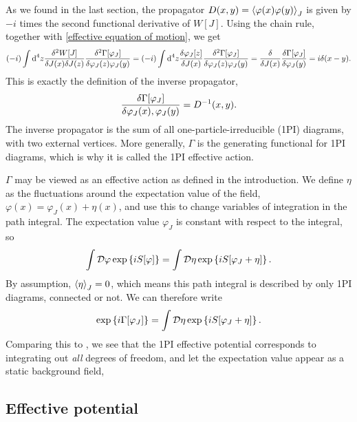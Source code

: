 As we found in the last section, the propagator $D(x, y) = \left\langle \varphi(x)\varphi(y) \right\rangle_J$ is given by $-i$ times the second functional derivative of $W[J]$.
Using the chain rule, together with \autoref{effective equation of motion}, we get
%
\begin{align}
    \label{Effective action inverse propagator}
    (-i)\int \dd^4 z \frac{\delta^2 W[J]}{\delta J(x) \delta J(z)} 
    \frac{\delta^2 \Gamma[\varphi_J]}{\delta \varphi_J(z) \varphi_J(y)}
    =
    (-i)\int \dd^4 z \frac{\delta \varphi_J[z]}{\delta J(x)}
    \frac{\delta^2 \Gamma[\varphi_J]}{\delta \varphi_J(z) \varphi_J(y)}
    =
    \fdv{}{J(x)}  \fdv{\Gamma[\varphi_J]}{\varphi_J(y)}
    = i\delta(x - y).
\end{align}
%
This is exactly the definition of the inverse propagator,
%
\begin{equation}
    \fdv{\Gamma[\varphi_J]}{\varphi_J(x),\varphi_J(y)} = D^{-1}(x, y).
\end{equation}
%
The inverse propagator is the sum of all one-particle-irreducible (1PI) diagrams, with two external vertices.
More generally, $\Gamma$ is the generating functional for 1PI diagrams, which is why it is called the 1PI effective action.

$\Gamma$ may be viewed as an effective action as defined in the introduction.
We define $\eta$ as the fluctuations around the expectation value of the field, $\varphi(x) = \varphi_J(x) + \eta(x)$, and use this to change variables of integration in the path integral.
The expectation value $\varphi_J$ is constant with respect to the integral, so 
\begin{equation}
    \int \mathcal D \varphi \, \text{exp} \left\{ i S[\varphi] \right\}
    = \int \mathcal D \eta \, \text{exp} \left\{ iS[\varphi_J + \eta] \right\}.
\end{equation}
%
By assumption, $\left\langle \eta \right\rangle_J = 0$, which means this path integral is described by only 1PI diagrams, connected or not. We can therefore write
%
\begin{equation}
    \text{exp} \left\{ i \Gamma[\varphi_J] \right\} = \int \mathcal D \eta \, \text{exp} \left\{ iS[\varphi_J + \eta] \right\}.
\end{equation}
%
Comparing this to , we see that the 1PI effective potential corresponds to integrating out \emph{all} degrees of freedom, and let the expectation value appear as a static background field,



\subsection{Effective potential}

